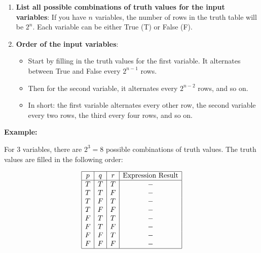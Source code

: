 \begin{enumerate}

	\item \textbf{List all possible combinations of truth values for the input variables}:
	      If you have \(n\) variables, the number of rows in the truth table will be \(2^n\). Each
	      variable can be either True (T) or False (F).

	\item \textbf{Order of the input variables}:

	      \begin{itemize}

		      \item Start by filling in the truth values for the first variable. It alternates between
		            True and False every \(2^{n-1}\) rows.

		      \item Then for the second variable, it alternates every \(2^{n-2}\) rows, and so on.

		      \item In short: the first variable alternates every other row, the second variable every two
		            rows, the third every four rows, and so on.

	      \end{itemize}

\end{enumerate}

\textbf{Example:}

For 3 variables, there are \(2^3 = 8\) possible combinations of truth values. The truth values are filled
in the following order:

\[
	\begin{array}{|c|c|c|c|}
		\hline
		p & q & r & \text{Expression Result} \\
		\hline
		T & T & T & -                        \\
		T & T & F & -                        \\
		T & F & T & -                        \\
		T & F & F & -                        \\
		F & T & T & -                        \\
		F & T & F & -                        \\
		F & F & T & -                        \\
		F & F & F & -                        \\
		\hline
	\end{array}
\]

